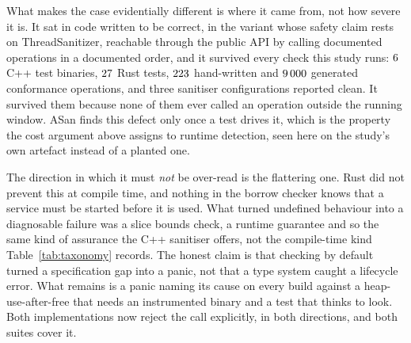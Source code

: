 \documentclass[english,oneside,a4paper,censored,csm,software-track-2020]{HYthesisML}
\begin{document}
What makes the case evidentially different is where it came from, not how severe it is. It sat in
code written to be correct, in the variant whose safety claim rests on ThreadSanitizer, reachable
through the public API by calling documented operations in a documented order, and it survived
every check this study runs: $6$ C++ test binaries, $27$ Rust tests,
$223$ hand-written and $9\,000$ generated conformance operations, and three
sanitiser configurations reported clean. It survived them because none of them ever called an
operation outside the running window. ASan finds this defect only once a test drives it, which is
the property the cost argument above assigns to runtime detection, seen here on the study's own
artefact instead of a planted one.

The direction in which it must \emph{not} be over-read is the flattering one. Rust did not
prevent this at compile time, and nothing in the borrow checker knows that a service must be
started before it is used. What turned undefined behaviour into a diagnosable failure was a
slice bounds check, a runtime guarantee and so the same kind of assurance the C++ sanitiser
offers, not the compile-time kind Table~\ref{tab:taxonomy} records. The honest claim is that
checking by default turned a specification gap into a panic, not that a type system caught a
lifecycle error. What remains is a panic naming its cause on every build against a
heap-use-after-free that needs an instrumented binary and a test that thinks to look. Both
implementations now reject the call explicitly, in both directions, and both suites cover it.
\end{document}
